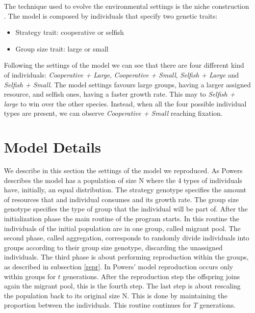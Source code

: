 \documentclass[runningheads]{llncs}
\begin{document}
The technique used to evolve the environmental settings is the niche
construction \cite{b10}. The model is composed by individuals that
specify two genetic traits:
\begin{itemize}
\item Strategy trait: cooperative or selfish
\item Group size trait: large or small
\end{itemize}
Following the settings of the model we can see that there are four
different kind of individuals: \textit{Cooperative + Large},
\textit{Cooperative + Small}, \textit{Selfish + Large} and
\textit{Selfish + Small}.
The model settings favours large groups, having a larger assigned
resource, and selfish ones, having a faster growth rate. This may to
\textit{Selfish + large} to win over the other species. Instead, when
all the four possible individual types are present, we can observe
\textit{Cooperative + Small} reaching fixation.

\section{Model Details}
We describe in this section the settings of the model we
reproduced. As Powers describes \cite{groups} the model has a
population of size N where the 4 types of individuals have, initially,
an equal distribution. The strategy genotype specifies the amount of
resources that and individual consumes and its growth rate. The group
size genotype specifies the type of group that the individual will be
part of. After the initialization phase the main routine of the
program starts. In this routine the individuals of the initial
population are in one group, called migrant pool. The second phase,
called aggregation, corresponds to randomly divide individuals into
groups according to their group size genotype, discarding the
unassigned individuals. The third phase is about performing reproduction
within the groups, as described in subsection \ref{repr}. In Powers'
model reproduction occurs only within groups for $t$ generations. After the reproduction
step the offspring joins again the migrant pool, this is the fourth
step. The last step is about rescaling the population back to its
original size N. This is done by maintaining the proportion between
the individuals. This routine continues for $T$ generations.
\end{document}
